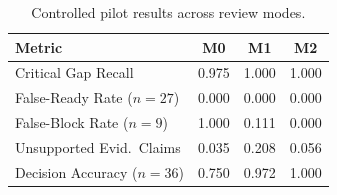 \begin{table}[t]
\centering
\caption{Controlled pilot results across review modes.}
\label{tab:results}
\footnotesize
\begin{tabular}{@{}lccc@{}}
\toprule
\textbf{Metric} & \textbf{M0} & \textbf{M1} & \textbf{M2} \\
\midrule
Critical Gap Recall & 0.975 & 1.000 & 1.000 \\
False-Ready Rate ($n{=}27$) & 0.000 & 0.000 & 0.000 \\
False-Block Rate ($n{=}9$) & 1.000 & 0.111 & 0.000 \\
Unsupported Evid.\ Claims & 0.035 & 0.208 & 0.056 \\
Decision Accuracy ($n{=}36$) & 0.750 & 0.972 & 1.000 \\
\bottomrule
\end{tabular}
\end{table}
